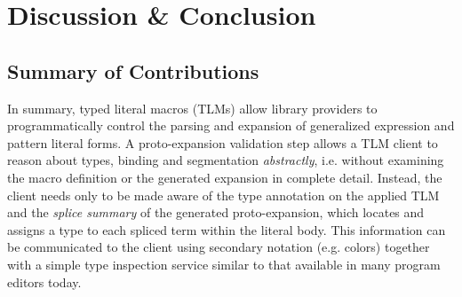 \chapter{Discussion \& Conclusion}\label{chap:conclusion}


\vspace{-4px}
\section{Summary of Contributions}

In summary, typed literal macros (TLMs) allow library providers to programmatically control the parsing and expansion of generalized expression and pattern literal forms. A proto-expansion validation step allows a TLM client to reason about types, binding and segmentation \emph{abstractly}, i.e. without examining the macro definition or the generated expansion in complete detail. Instead, the client needs only to be made aware of the type annotation on the applied TLM and the \emph{splice summary} of the generated proto-expansion, which locates and assigns a type to each spliced term within the literal body. This information can be communicated to the client using secondary notation (e.g. colors) together with a simple type inspection service similar to that available in many program editors today.

